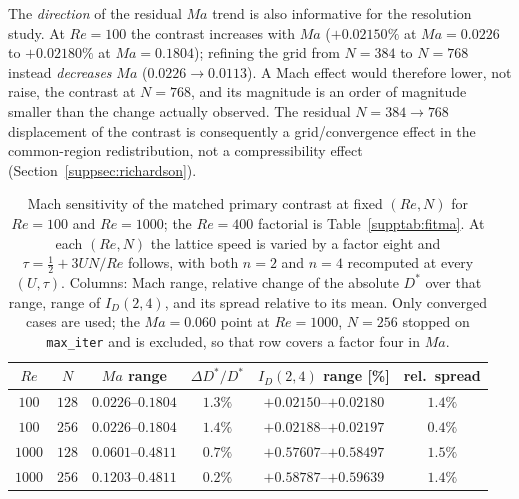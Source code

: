The \emph{direction} of the residual $Ma$ trend is also informative for the resolution study. At $Re=100$ the contrast increases with $Ma$ ($+0.02150\%$ at $Ma=0.0226$ to $+0.02180\%$ at $Ma=0.1804$); refining the grid from $N=384$ to $N=768$ instead \emph{decreases} $Ma$ ($0.0226\to0.0113$). A Mach effect would therefore lower, not raise, the contrast at $N=768$, and its magnitude is an order of magnitude smaller than the change actually observed. The residual $N=384\to768$ displacement of the contrast is consequently a grid/convergence effect in the common-region redistribution, not a compressibility effect (Section~\ref{suppsec:richardson}).

\begin{table}[!htbp]
\centering
\caption{Mach sensitivity of the matched primary contrast at fixed $(Re,N)$ for $Re=100$ and $Re=1000$; the $Re=400$ factorial is Table~\ref{supptab:fitma}. At each $(Re,N)$ the lattice speed is varied by a factor eight and $\tau=\tfrac12+3UN/Re$ follows, with both $n=2$ and $n=4$ recomputed at every $(U,\tau)$. Columns: Mach range, relative change of the absolute $D^*$ over that range, range of $I_D(2,4)$, and its spread relative to its mean. Only converged cases are used; the $Ma=0.060$ point at $Re=1000$, $N=256$ stopped on \texttt{max\_iter} and is excluded, so that row covers a factor four in $Ma$.}
\label{supptab:ma_low_high}
\begin{tabular}{@{}cccccc@{}}
\hline
$Re$ & $N$ & $Ma$ range & $\Delta D^*/D^*$ & $I_D(2,4)$ range [\%] & rel.\ spread \\
\hline
$100$  & $128$ & $0.0226$--$0.1804$ & $1.3\%$ & $+0.02150$--$+0.02180$ & $1.4\%$ \\
$100$  & $256$ & $0.0226$--$0.1804$ & $1.4\%$ & $+0.02188$--$+0.02197$ & $0.4\%$ \\
$1000$ & $128$ & $0.0601$--$0.4811$ & $0.7\%$ & $+0.57607$--$+0.58497$ & $1.5\%$ \\
$1000$ & $256$ & $0.1203$--$0.4811$ & $0.2\%$ & $+0.58787$--$+0.59639$ & $1.4\%$ \\
\hline
\end{tabular}
\end{table}
